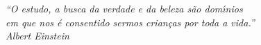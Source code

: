 \begin{epigrafe}
    \vspace*{\fill}
	\begin{flushright}
		\textit{``O estudo, a busca da verdade e da beleza s\~ao dom\'{\i}nios \\
		em que nos \'e consentido sermos crian\c{c}as por toda a vida.''\\
		Albert Einstein}
	\end{flushright}
\end{epigrafe}
